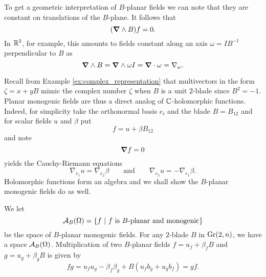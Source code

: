 To get a geometric interpretation of $B$-planar fields we can note that they are constant on translations of the $B$-plane.  It follows that 
\begin{equation}
\label{eq:exterior_b_derivative}
(\boldsymbol{\nabla} \wedge B)f = 0.
\end{equation}
In $\mathbb{R}^3$, for example, this amounts to fields constant along an axis $\omega=IB^{-1}$ perpendicular to $B$ as
\begin{equation}
\label{eq:omega_axial_equivalence}
\boldsymbol{\nabla} \wedge B = \boldsymbol{\nabla} \wedge \omega I =\boldsymbol{\nabla} \cdot \omega = \nabla_\omega.
\end{equation}


Recall from Example \ref{ex:complex_representation} that multivectors in the form $\zeta=x+yB$ mimic the complex number $\zeta$ when $B$ is a unit $2$-blade since $B^2=-1$.  Planar monogenic fields are thus a direct analog of $\mathbb{C}$-holomorphic functions.  Indeed, for simplicity take the orthonormal basis $e_i$ and the blade $B=B_{12}$ and for scalar fields $u$ and $\beta$ put
\[
f=u+\beta B_{12}
\]
and note
\[
\boldsymbol{\nabla} f = 0 
\]
yields the Cauchy-Riemann equations
\[
\nabla_{e_1} u = \nabla_{e_2} \beta \qquad \textrm{and} \qquad \nabla_{e_2}u = -\nabla_{e_1} \beta.
\]
Holomorphic functions form an algebra and we shall show the $B$-planar monogenic fields do as well. 

We let 
\[
\mathcal{A}_{B}(\Omega) = \{f ~\vert~ \textrm{$f$ is $B$-planar and monogenic}\}
\]
be the space of $B$-planar monogenic fields. For any $2$-blade $B$ in $\operatorname{Gr}(2,n)$, we have a space $\mathcal{A}_{B}(\Omega)$. Multiplication of two $B$-planar fields $f=u_f+\beta_f B$ and $g=u_g+\beta_g B$ is given by
\begin{equation}
\label{eq:axial_multiplication}
fg = u_f u_g - \beta_f \beta_g + B (u_f b_g + u_g b_f) = gf.
\end{equation}

